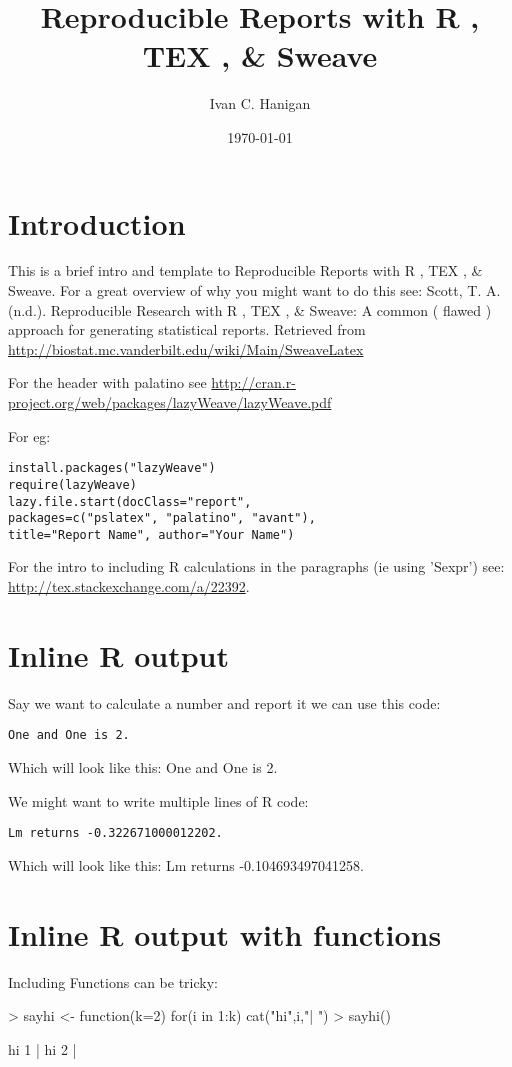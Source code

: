 \documentclass[a4paper]{report}
\begin{document}



\title{Reproducible Reports with R , TEX , \& Sweave}
\author{Ivan C. Hanigan}
\date{\today}
\maketitle
\tableofcontents

\section*{Introduction}
This is a brief intro and template to Reproducible Reports with R , TEX , \& Sweave. For a great overview of why you might want to do this see: 
Scott, T. A. (n.d.). Reproducible Research with R , TEX , \& Sweave: A common ( flawed ) approach for generating statistical reports. Retrieved from \url{http://biostat.mc.vanderbilt.edu/wiki/Main/SweaveLatex}


For the header with palatino see 
\url{http://cran.r-project.org/web/packages/lazyWeave/lazyWeave.pdf}

For eg:
\begin{verbatim}
install.packages("lazyWeave")
require(lazyWeave)
lazy.file.start(docClass="report", 
packages=c("pslatex", "palatino", "avant"), 
title="Report Name", author="Your Name")
\end{verbatim}

For the intro to including R calculations in the paragraphs (ie using 'Sexpr') see:
\url{http://tex.stackexchange.com/a/22392}.

\section{Inline R output}
Say we want to calculate a number and report it we can use this code:

\begin{verbatim}
One and One is 2.
\end{verbatim}
Which will look like this: One and One is 2.

We might want to write multiple lines of R code:
\begin{verbatim}
Lm returns -0.322671000012202.
\end{verbatim}

Which will look like this: Lm returns -0.104693497041258.

\section{Inline R output with functions}
Including Functions can be tricky:
\begin{Schunk}
\begin{Sinput}
> sayhi <- function(k=2) {for(i in 1:k) cat("hi",i,"| ") }
> sayhi()
\end{Sinput}
\begin{Soutput}
hi 1 | hi 2 | 
\end{Soutput}
\end{Schunk}
\end{document}
